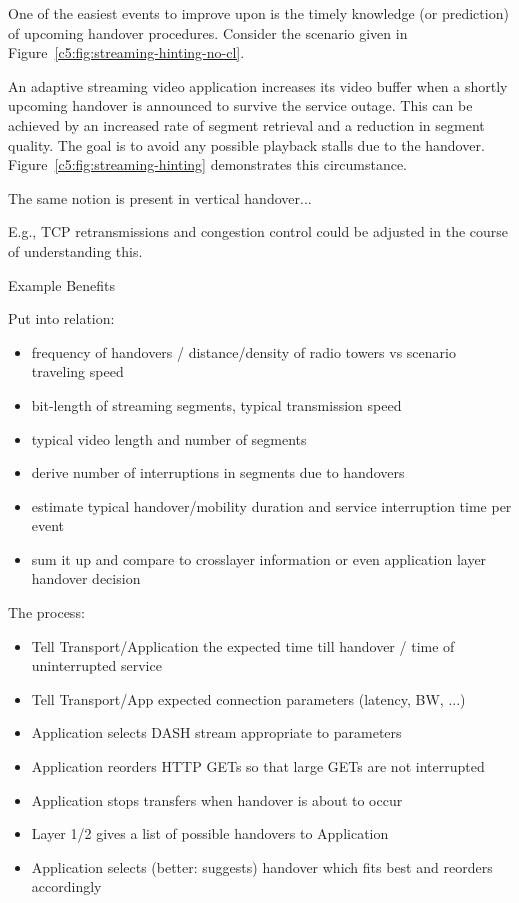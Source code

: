 One of the easiest events to improve upon is the timely knowledge (or prediction) of upcoming handover procedures. Consider the scenario given in Figure~\ref{c5:fig:streaming-hinting-no-cl}.

An adaptive streaming video application increases its video buffer when a shortly upcoming handover is announced to survive the service outage. This can be achieved by an increased rate of segment retrieval and a reduction in segment quality. The goal is to avoid any possible playback stalls due to the handover. Figure~\ref{c5:fig:streaming-hinting} demonstrates this circumstance.





The same notion is present in vertical handover...


 E.g., \gls{TCP} retransmissions and congestion control could be adjusted in the course of understanding this.

Example Benefits

Put into relation:

\begin{itemize}
	\item frequency of handovers / distance/density of radio towers vs scenario traveling speed
	\item bit-length of streaming segments, typical transmission speed
	\item typical video length and number of segments
	\item derive number of interruptions in segments due to handovers
	\item estimate typical handover/mobility duration and service interruption time per event
	\item sum it up and compare to crosslayer information or even application layer handover decision
\end{itemize}


The process:
	\begin{itemize}
	\item Tell Transport/Application the expected time till handover / time of uninterrupted service
	\item Tell Transport/App expected connection parameters (latency, BW, ...)
	\item Application selects \gls{DASH} stream appropriate to parameters
	\item Application reorders \gls{HTTP} GETs so that large GETs are not interrupted
	\item Application stops transfers when handover is about to occur
	\item Layer 1/2 gives a list of possible handovers to Application
	\item Application selects (better: suggests) handover which fits best and reorders accordingly
\end{itemize}




